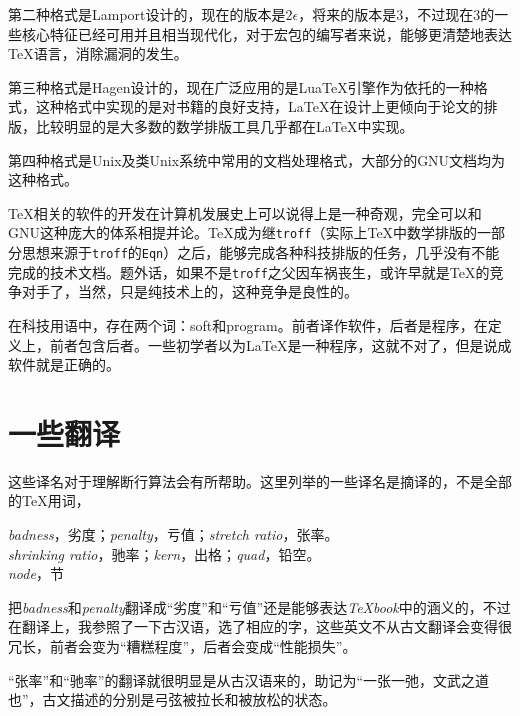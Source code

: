 \documentclass{article}
\newcommand{\TeXbook}{\textit{\TeX book}}
\begin{document}
第二种格式是Lamport设计的，现在的版本是$2\epsilon$，将来的版本是3，不过现在3的一些核心特征已经可用并且相当现代化，对于宏包的编写者来说，能够更清楚地表达\TeX 语言，消除漏洞的发生。

第三种格式是Hagen设计的，现在广泛应用的是Lua\TeX 引擎作为依托的一种格式，这种格式中实现的是对书籍的良好支持，\LaTeX 在设计上更倾向于论文的排版，比较明显的是大多数的数学排版工具几乎都在\LaTeX 中实现。

第四种格式是Unix及类Unix系统中常用的文档处理格式，大部分的GNU文档均为这种格式。

\TeX 相关的软件的开发在计算机发展史上可以说得上是一种奇观，完全可以和GNU这种庞大的体系相提并论。\TeX 成为继\verb!troff!（实际上\TeX 中数学排版的一部分思想来源于\verb!troff!的\verb!Eqn!）之后，能够完成各种科技排版的任务，几乎没有不能完成的技术文档。题外话，如果不是\verb!troff!之父因车祸丧生，或许早就是\TeX 的竞争对手了，当然，只是纯技术上的，这种竞争是良性的。

在科技用语中，存在两个词：soft和program。前者译作{\hei 软件}，后者是{\hei 程序}，在定义上，前者包含后者。一些初学者以为\LaTeX 是一种{\hei 程序}，这就不对了，但是说成{\hei 软件}就是正确的。
\section{一些翻译}
这些译名对于理解断行算法会有所帮助。这里列举的一些译名是摘译的，不是全部的\TeX 用词，
\begin{center}
\textit{badness}，劣度；\textit{penalty}，亏值；\textit{stretch ratio}，张率。\\
\textit{shrinking ratio}，驰率；\textit{kern}，出格；\textit{quad}，铅空。\\
\textit{node}，节
\end{center}

把\textit{badness}和\textit{penalty}翻译成“劣度”和“亏值”还是能够表达\TeXbook 中的涵义的，不过在翻译上，我参照了一下古汉语，选了相应的字，这些英文不从古文翻译会变得很冗长，前者会变为“糟糕程度”，后者会变成“性能损失”。

“张率”和“驰率”的翻译就很明显是从古汉语来的，助记为“一张一弛，文武之道也”，古文描述的分别是弓弦被拉长和被放松的状态。
\end{document}
